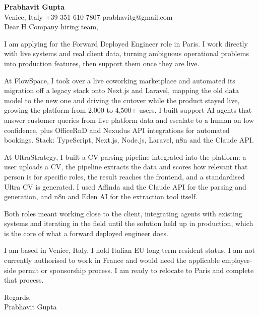 \documentclass[a4paper,10.5pt]{article}
\begin{document}
\textbf{Prabhavit Gupta}\\
Venice, Italy \textbar{} +39 351 610 7807 \textbar{} prabhavitg@gmail.com\\[10pt]
Dear H Company hiring team,

I am applying for the Forward Deployed Engineer role in Paris. I work directly with live systems and real client data, turning ambiguous operational problems into production features, then support them once they are live.

At FlowSpace, I took over a live coworking marketplace and automated its migration off a legacy stack onto Next.js and Laravel, mapping the old data model to the new one and driving the cutover while the product stayed live, growing the platform from 2,000 to 4,500+ users. I built support AI agents that answer customer queries from live platform data and escalate to a human on low confidence, plus OfficeRnD and Nexudus API integrations for automated bookings. Stack: TypeScript, Next.js, Node.js, Laravel, n8n and the Claude API.

At UltraStrategy, I built a CV-parsing pipeline integrated into the platform: a user uploads a CV, the pipeline extracts the data and scores how relevant that person is for specific roles, the result reaches the frontend, and a standardised Ultra CV is generated. I used Affinda and the Claude API for the parsing and generation, and n8n and Eden AI for the extraction tool itself.

Both roles meant working close to the client, integrating agents with existing systems and iterating in the field until the solution held up in production, which is the core of what a forward deployed engineer does.

I am based in Venice, Italy. I hold Italian EU long-term resident status. I am not currently authorised to work in France and would need the applicable employer-side permit or sponsorship process. I am ready to relocate to Paris and complete that process.

Regards,\\
Prabhavit Gupta
\end{document}
